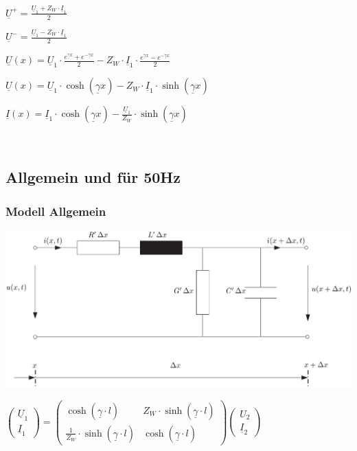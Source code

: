 $
\boxed{\underline{U}^+ = \frac{\underline{U}_1 + Z_W \cdot \underline{I}_1}{2}}
$

$
\boxed{\underline{U}^- = \frac{\underline{U}_1 - Z_W \cdot \underline{I}_1}{2}}
$

$
\boxed{\underline{U}(x) = \underline{U}_1 \cdot \frac{e^{\underline{\gamma} x} + e^{-\underline{\gamma} x}}{2} 
- Z_W \cdot \underline{I}_1 \cdot \frac{e^{\underline{\gamma} x} - e^{-\underline{\gamma} x}}{2}}
$

$
\boxed{\underline{U}(x) = \underline{U}_1 \cdot \cosh(\underline{\gamma} x) 
- Z_W \cdot \underline{I}_1 \cdot \sinh(\underline{\gamma} x)}
$

$
\boxed{\underline{I}(x) = \underline{I}_1 \cdot \cosh(\underline{\gamma} x) 
- \frac{\underline{U}_1}{Z_W} \cdot \sinh(\underline{\gamma} x)}
$

$
\boxed{}
$

\newcolumn
\subsection{Allgemein und für 50Hz}
\subsubsection{Modell Allgemein}

\includegraphics[width=0.98\columnwidth, align=c]{images/Leitungsgleichungen_1.png}

\vspace{0.15cm}

$\boxed{
\begin{pmatrix}
    \underline{U}_1 \\
    \underline{I}_1
    \end{pmatrix}
    =
    \begin{pmatrix}
    \cosh(\underline{\gamma} \cdot l) & Z_W \cdot \sinh(\underline{\gamma} \cdot l) \\
    \frac{1}{Z_W} \cdot \sinh(\underline{\gamma} \cdot l) & \cosh(\underline{\gamma} \cdot l)
    \end{pmatrix}
    \begin{pmatrix}
    U_2 \\
    \underline{I}_2
\end{pmatrix}}
$



